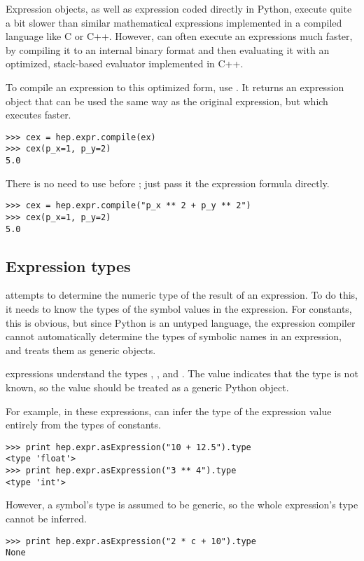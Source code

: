 Expression objects, as well as expression coded directly in Python,
execute quite a bit slower than similar mathematical expressions
implemented in a compiled language like C or C++.  However, \pyhep can
often execute an expressions much faster, by compiling it to an internal
binary format and then evaluating it with an optimized, stack-based
evaluator implemented in C++.

To compile an expression to this optimized form, use
.  It returns an expression object that can
be used the same way as the original expression, but which executes
faster.
\begin{verbatim}
>>> cex = hep.expr.compile(ex)
>>> cex(p_x=1, p_y=2)
5.0
\end{verbatim}

There is no need to use  before ; just
pass it the expression formula directly.
\begin{verbatim}
>>> cex = hep.expr.compile("p_x ** 2 + p_y ** 2")
>>> cex(p_x=1, p_y=2)
5.0
\end{verbatim}


\subsection{Expression types}

\pyhep attempts to determine the numeric type of the result of an
expression.  To do this, it needs to know the types of the symbol values
in the expression.  For constants, this is obvious, but since Python is
an untyped language, the expression compiler cannot automatically
determine the types of symbolic names in an expression, and treats them
as generic objects.  

\pyhep expressions understand the types , , and
.  The value  indicates that the type is not
known, so the value should be treated as a generic Python object.

For example, in these expressions, \pyhep can infer the type of the
expression value entirely from the types of constants.
\begin{verbatim}
>>> print hep.expr.asExpression("10 + 12.5").type
<type 'float'>
>>> print hep.expr.asExpression("3 ** 4").type
<type 'int'>
\end{verbatim}
However, a symbol's type is assumed to be generic, so the whole
expression's type cannot be inferred.
\begin{verbatim}
>>> print hep.expr.asExpression("2 * c + 10").type
None
\end{verbatim}

